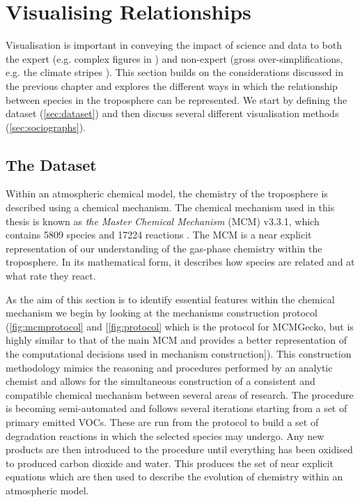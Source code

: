 \section{Visualising Relationships}\label{sec:visrel}

Visualisation is important in conveying the impact of science and data to both the expert (e.g. complex figures in \citep{IPCC2007Science}) and non-expert (gross over-simplifications, e.g. the climate stripes \citep{stripes}). This section builds on the considerations discussed in the previous chapter and explores the different ways in which the relationship between species in the troposphere can be represented. We start by defining the dataset (\autoref{sec:dataset}) and then discuss several different visualisation methods (\autoref{sec:sociographs}).

\subsection{The Dataset}\label{sec:dataset}

Within an atmospheric chemical model, the chemistry of the troposphere is described using a chemical mechanism. The chemical mechanism used in this thesis is known as \emph{the Master Chemical Mechanism} (MCM) v3.3.1, which contains  5809 species and 17224 reactions \citep{mcm}. The MCM is a near explicit representation of our understanding of the gas-phase chemistry within the troposphere. In its mathematical form, it describes how species are related and at what rate they react.



 As the aim of this section is to identify essential features within the chemical mechanism we begin by looking at the mechanisms construction protocol (\autoref{fig:mcmprotocol} and [\autoref{fig:protocol} which is the protocol for MCMGecko, but is highly similar to that of the main MCM and provides a better representation of the computational decisions used in mechanism construction]). This construction methodology mimics the reasoning and procedures performed by an analytic chemist and allows for the simultaneous construction of a consistent and compatible chemical mechanism between several areas of research.  The procedure is becoming semi-automated and follows several iterations starting from a set of primary emitted VOCs. These are run from the protocol to build a set of degradation reactions in which the selected species may undergo. Any new products are then introduced to the procedure until everything has been oxidised to produced carbon dioxide and water. This produces the set of near explicit equations which are then used to describe the evolution of chemistry within an atmospheric model.

